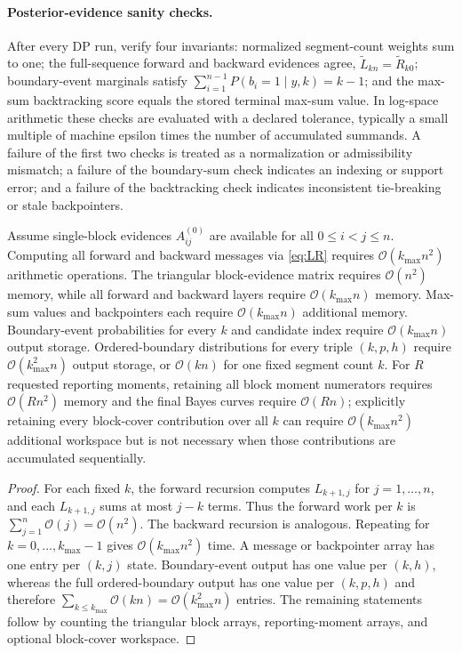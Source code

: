 \paragraph{Posterior-evidence sanity checks.}
After every DP run, verify four invariants: normalized segment-count weights
sum to one; the full-sequence forward and backward evidences agree, $\widetilde L_{kn}=\widetilde
R_{k0}$; boundary-event marginals satisfy $\sum_{i=1}^{n-1}P(b_i=1\mid y,k)=k-1$; and the
max-sum backtracking score equals the stored terminal max-sum value. In log-space arithmetic these
checks are evaluated with a declared tolerance, typically a small multiple of machine epsilon times
the number of accumulated summands. A failure of the first two checks is treated as a normalization
or admissibility mismatch; a failure of the boundary-sum check indicates an indexing or support
error; and a failure of the backtracking check indicates inconsistent tie-breaking or stale
backpointers.

\begin{theorem}
\label{thm:dp-complexity}
Assume single-block evidences $A^{(0)}_{ij}$ are available for all $0\le i<j\le n$.
Computing all forward and backward messages via \eqref{eq:LR} requires
$\mathcal{O}(k_{\max}n^2)$ arithmetic operations. The triangular block-evidence matrix requires
$\mathcal{O}(n^2)$ memory, while all forward and backward layers require
$\mathcal{O}(k_{\max}n)$ memory. Max-sum values and backpointers each require
$\mathcal{O}(k_{\max}n)$ additional memory. Boundary-event probabilities for every $k$ and candidate
index require $\mathcal{O}(k_{\max}n)$ output storage. Ordered-boundary distributions for every
triple $(k,p,h)$ require $\mathcal{O}(k_{\max}^2n)$ output storage, or $\mathcal{O}(kn)$ for one
fixed segment count $k$. For $R$ requested reporting moments, retaining all block moment numerators
requires $\mathcal{O}(Rn^2)$ memory and the final Bayes curves require $\mathcal{O}(Rn)$; explicitly
retaining every block-cover contribution over all $k$ can require
$\mathcal{O}(k_{\max}n^2)$ additional workspace but is not necessary when those contributions are
accumulated sequentially.
\end{theorem}

\begin{proof}
For each fixed $k$, the forward recursion computes $L_{k+1,j}$ for $j=1,\dots,n$, and each
$L_{k+1,j}$ sums at most $j-k$ terms. Thus the forward work per $k$ is
$\sum_{j=1}^n \mathcal{O}(j)=\mathcal{O}(n^2)$. The backward recursion is analogous. Repeating
for $k=0,\dots,k_{\max}-1$ gives $\mathcal{O}(k_{\max}n^2)$ time. A message or backpointer array
has one entry per $(k,j)$ state. Boundary-event output has one value per $(k,h)$, whereas the full
ordered-boundary output has one value per $(k,p,h)$ and therefore
$\sum_{k\le k_{\max}}\mathcal O(kn)=\mathcal O(k_{\max}^2n)$ entries. The remaining statements
follow by counting the triangular block arrays, reporting-moment arrays, and optional block-cover
workspace.
\end{proof}

